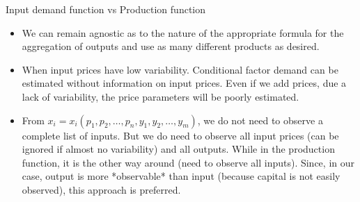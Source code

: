 \documentclass[10pt,mathserif,aspectratio=169]{beamer}
\begin{document}
\begin{frame}[label=production]{Input demand function vs Production function}
  \begin{itemize}
    \item We can remain agnostic as to the nature of the appropriate formula for the
          aggregation of outputs and use as many different products as desired.
    \item When input prices have low variability. Conditional factor demand can be
          estimated without information on input prices. Even if we add prices, due a
          lack of variability, the price parameters will be poorly estimated.

    \item From $x_i = x_i(p_1, p_2, \ldots, p_n, y_1, y_2, \ldots, y_m)$, we do not need
          to observe a complete list of inputs. But we do need to observe all input
          prices (can be ignored if almost no variability) and all outputs. While in the
          production function, it is the other way around (need to observe all inputs).
          Since, in our case, output is more *observable* than input (because capital is
          not easily observed), this approach is preferred.
  \end{itemize}
\end{frame}
\end{document}
